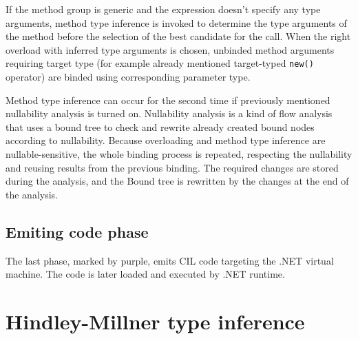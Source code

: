 If the method group is generic and the expression doesn’t specify any type arguments, method type inference is invoked to determine the type arguments of the method before the selection of the best candidate for the call.
When the right overload with inferred type arguments is chosen, unbinded method arguments requiring target type (for example already mentioned target-typed \texttt{new()} operator) are binded using corresponding parameter type.
\par
Method type inference can occur for the second time if previously mentioned nullability analysis is turned on. 
Nullability analysis is a kind of flow analysis that uses a bound tree to check and rewrite already created bound nodes according to nullability. 
Because overloading and method type inference are nullable-sensitive, the whole binding process is repeated, respecting the nullability and reusing results from the previous binding. 
The required changes are stored during the analysis, and the Bound tree is rewritten by the changes at the end of the analysis.

\subsection{Emiting code phase}

The last phase, marked by purple, emits \ac{CIL} code targeting the .NET virtual machine.
The code is later loaded and executed by .NET runtime.

\section{Hindley-Millner type inference}

